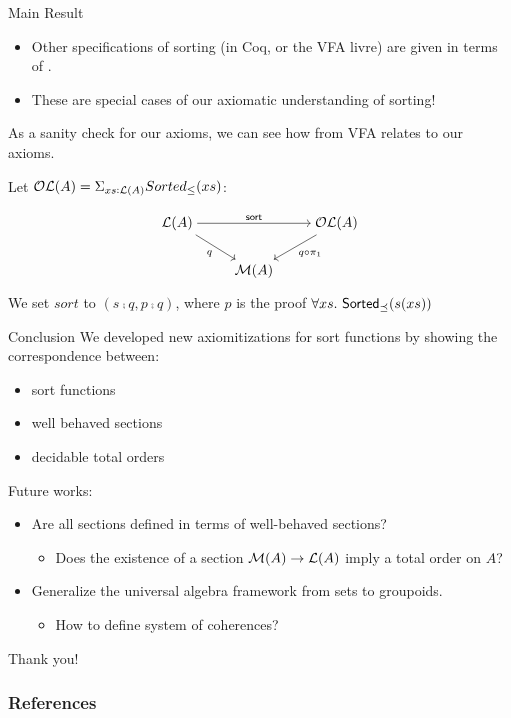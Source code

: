 \documentclass[9pt]{beamer}
\begin{document}
\begin{frame}{Main Result}

  \begin{tblock}[Remarks]
  \begin{itemize}
      \item Other specifications of sorting (in Coq, or the VFA livre) are given in terms of .
      \item These are special cases of our axiomatic understanding of sorting!
  \end{itemize}
  \end{tblock}

  As a sanity check for our axioms, we can
  see how  from VFA relates to our axioms.

  Let $\mathcal{OL}(A) = \Sigma_{xs : \mathcal{L}(A)} Sorted_\leq(xs)$:

      \[\begin{tikzcd}[ampersand replacement=\&,cramped]
            {\LL(A)} \&\& {\OL(A)} \\
            \& {\MM(A)}
            \arrow["{\term{sort}}", from=1-1, to=1-3]
            \arrow["q"', from=1-1, to=2-2]
            \arrow["{q \comp \pi_1}", from=1-3, to=2-2]
        \end{tikzcd}\]

  We set $sort$ to $(s \comp q, p \comp q)$, where $p$ is the proof
  $\forall xs.\, \operatorname{\mathsf{Sorted}}_\preceq(s(xs))$

\end{frame}

\begin{frame}{Conclusion}
We developed new axiomitizations for sort functions by showing the correspondence between:
  \begin{itemize}
      \item sort functions
      \item well behaved sections
      \item decidable total orders
  \end{itemize}
Future works:
  \begin{itemize}
      \item Are all sections defined in terms of well-behaved sections?
      \begin{itemize}
        \item Does the existence of a section $\mathcal{M}(A) \to \mathcal{L}(A)$ imply a total order on $A$?
      \end{itemize}
      \item Generalize the universal algebra framework from sets to groupoids.
      \begin{itemize}
        \item How to define system of coherences?
      \end{itemize}
  \end{itemize}
\end{frame}

\begin{frame}[standout]
    Thank you!
\end{frame}


\begin{frame}[allowframebreaks]
    \frametitle{References}
    \printbibliography[heading=none]
\end{frame}
\end{document}
